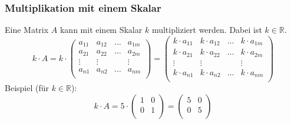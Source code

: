 \subsubsection{Multiplikation mit einem Skalar}
Eine Matrix $A$ kann mit einem Skalar $k$ multipliziert werden. Dabei
ist $k \in \mathbb{R}$.
\[ k \cdot A = k \cdot
  \begin {pmatrix}
    a_{11} & a_{12} &  \hdots & a_{1m} \\
    a_{21} & a_{22} &  \hdots & a_{2m} \\
    \vdots  & \vdots   &      & \vdots  \\
    a_{n1} & a_{n2} &  \hdots & a_{nm} \\
  \end {pmatrix} = 
  \begin {pmatrix}
    k \cdot a_{11} & k \cdot a_{12} &  \hdots & k \cdot a_{1m} \\
    k \cdot a_{21} & k \cdot a_{22} &  \hdots & k \cdot a_{2m} \\
    \vdots  & \vdots   &      & \vdots  \\
    k \cdot a_{n1} & k \cdot a_{n2} &  \hdots & k \cdot a_{nm} \\
  \end {pmatrix}
\]
Beispiel (für $k \in \mathbb{R}$):
\[ k \cdot A = 5 \cdot
  \begin {pmatrix} 1 & 0 \\ 0 & 1 \\ \end {pmatrix} =
  \begin {pmatrix} 5 & 0 \\ 0 & 5 \\ \end {pmatrix} 
\]
